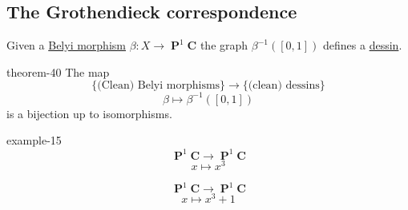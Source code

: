 \documentclass[10pt,]{book}
\numberwithin{equation}{section}
\newcommand{\inv}{^{-1}}
\newcommand{\lb}{[}
\newcommand{\rb}{]}
\newcommand{\CC}{\mathbf{C}}
\DeclareMathOperator{\PP}{\mathbf{P}}
\begin{document}
\subsection[{The Grothendieck correspondence}]{The Grothendieck correspondence}\label{subsection-40}
\hypertarget{p-468}{}%
Given a \hyperref[def-belyi-morphism]{Belyi morphism} \(\beta\colon X \to \PP^1 \CC\) the graph \(\beta^{-1}(\lb 0,1\rb)\) defines a \hyperref[def-dessin-denfant]{dessin}.%
\begin{theorem}{}{}{theorem-40}%
\hypertarget{p-469}{}%
The map%
\begin{equation*}
\{\text{(Clean) Belyi morphisms}\} \to \{\text{(clean) dessins}\}
\end{equation*}
%
\begin{equation*}
\beta \mapsto \beta\inv([0,1])
\end{equation*}
is a bijection up to isomorphisms.%
\end{theorem}
\begin{example}{}{example-15}%
\hypertarget{p-470}{}%
%
\begin{equation*}
\PP^1 \CC\to \PP^1\CC
\end{equation*}
%
\begin{equation*}
x\mapsto x^3
\end{equation*}
%
\par
\hypertarget{p-471}{}%
%
\begin{equation*}
\PP^1 \CC\to \PP^1\CC
\end{equation*}
%
\begin{equation*}
x\mapsto x^3 + 1
\end{equation*}
%
\end{example}
%
%
\typeout{************************************************}
\typeout{************************************************}
%
\end{document}
